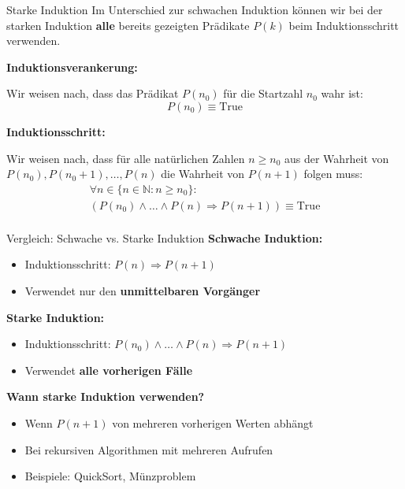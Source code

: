\documentclass[a4paper, fontsize=7pt]{scrartcl}
\begin{document}
\begin{mainbox}{Starke Induktion}
Im Unterschied zur schwachen Induktion können wir bei der starken Induktion \textbf{alle} bereits gezeigten Prädikate $P(k)$ beim Induktionsschritt verwenden.

\textbf{Induktionsverankerung:}

Wir weisen nach, dass das Prädikat $P(n_0)$ für die Startzahl $n_0$ wahr ist:
$$P(n_0) \equiv \text{True}$$

\textbf{Induktionsschritt:}

Wir weisen nach, dass für alle natürlichen Zahlen $n \geq n_0$ aus der Wahrheit von $P(n_0), P(n_0+1), \ldots, P(n)$ die Wahrheit von $P(n+1)$ folgen muss:
\begin{gather*}
    \forall n \in \{n \in \mathbb{N} : n \geq n_0\} :\\
    (P(n_0) \land \ldots \land P(n) \Rightarrow P(n+1)) \equiv \text{True}\\
\end{gather*}
\end{mainbox}

\begin{mainbox}{Vergleich: Schwache vs. Starke Induktion}
\textbf{Schwache Induktion:}
\begin{itemize}
    \item Induktionsschritt: $P(n) \Rightarrow P(n+1)$
    \item Verwendet nur den \textbf{unmittelbaren Vorgänger}
\end{itemize}

\textbf{Starke Induktion:}
\begin{itemize}
    \item Induktionsschritt: $P(n_0) \land \ldots \land P(n) \Rightarrow P(n+1)$
    \item Verwendet \textbf{alle vorherigen Fälle}
\end{itemize}

\textbf{Wann starke Induktion verwenden?}
\begin{itemize}
    \item Wenn $P(n+1)$ von mehreren vorherigen Werten abhängt
    \item Bei rekursiven Algorithmen mit mehreren Aufrufen
    \item Beispiele: QuickSort, Münzproblem
\end{itemize}
\end{mainbox}
\end{document}
